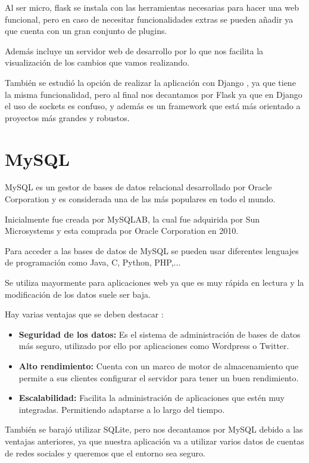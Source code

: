 Al ser micro, flask se instala con las herramientas necesarias para hacer una web funcional, pero en caso de necesitar funcionalidades extras se pueden añadir ya que cuenta con un gran conjunto de plugins.

Además incluye un servidor web de desarrollo por lo que nos facilita la visualización de los cambios que vamos realizando.

También se estudió la opción de realizar la aplicación con Django \cite{django}, ya que tiene la misma funcionalidad, pero al final nos decantamos por Flask ya que en Django el uso de sockets es confuso, y además es un framework que está más orientado a proyectos más grandes y robustos.

\section{MySQL}
MySQL \cite{mysql} es un gestor de bases de datos relacional desarrollado por Oracle Corporation y es considerada una de las más populares en todo el mundo.

Inicialmente fue creada por MySQLAB, la cual fue adquirida por Sun Microsystems y esta comprada por Oracle Corporation en 2010.

Para acceder a las bases de datos de MySQL se pueden usar diferentes lenguajes de programación como Java, C, Python, PHP,...

Se utiliza mayormente para aplicaciones web ya que es muy rápida en lectura y la modificación de los datos suele ser baja.

Hay varias ventajas que se deben destacar \cite{mysql_ventajas}:
\begin{itemize}
\tightlist
    \item\textbf{Seguridad de los datos:} Es el sistema de administración de bases de datos más seguro, utilizado por ello por aplicaciones como Wordpress o Twitter.
    
    \item\textbf{Alto rendimiento:} Cuenta con un marco de motor de almacenamiento que permite a sus clientes configurar el servidor para tener un buen rendimiento.
    
    \item\textbf{Escalabilidad:} Facilita la administración de aplicaciones que estén muy integradas. Permitiendo adaptarse a lo largo del tiempo.
\end{itemize}

También se barajó utilizar SQLite, pero nos decantamos por MySQL debido a las ventajas anteriores, ya que nuestra aplicación va a utilizar varios datos de cuentas de redes sociales y queremos que el entorno sea seguro.

